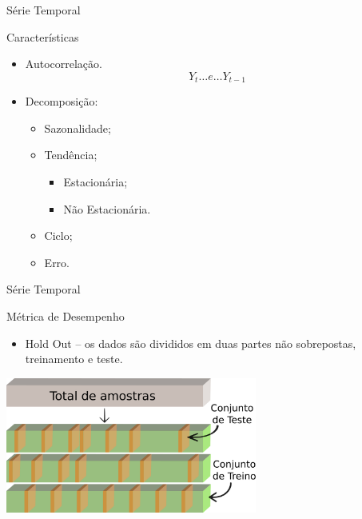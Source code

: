 \documentclass[aspectratio=169]{beamer}
\begin{document}
\begin{frame}{Série Temporal}
\begin{block}{Características}
        \begin{itemize}
            \item Autocorrelação.
            \begin{equation}
            Y_{t} \dots e \dots Y_{t - 1}
            \end{equation}
            \item Decomposição:
                \begin{itemize}[triangle]
                    \item Sazonalidade;
                    \item Tendência;
                        \begin{itemize}[square]\small
                            \item Estacionária;
                            \item Não Estacionária.
                        \end{itemize}
                    \item Ciclo;
                    \item Erro.
                \end{itemize}
        \end{itemize}
        \end{block}
\end{frame}


\begin{frame}{Série Temporal}
\begin{block}{Métrica de Desempenho}
    \begin{itemize}
        \item Hold Out -- os dados são divididos em duas partes não sobrepostas, treinamento e teste.
        \end{itemize}
    
\end{block}
    \centering
\includegraphics[width=0.62\textwidth,angle=0]{holdout.pdf}
\end{frame}
\end{document}
